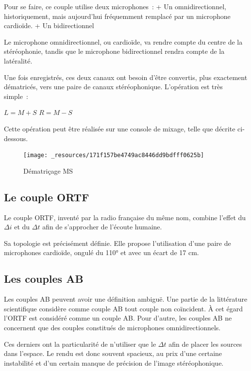\documentclass[
]{book}
\begin{document}
Pour se faire, ce couple utilise deux microphones~:
+ Un omnidirectionnel, historiquement, mais aujourd'hui fréquemment remplacé par un microphone cardioïde.
+ Un bidirectionnel

Le microphone omnidirectionnel, ou cardioïde, va rendre compte du centre de la stéréophonie, tandis que le microphone bidirectionnel rendra compte de la latéralité.

Une fois enregistrés, ces deux canaux ont besoin d'être convertis, plus exactement dématricés, vers une paire de canaux stéréophonique. L'opération est très simple~:

\(L = M+S\)
\(R = M-S\)

Cette opération peut être réalisée sur une console de mixage, telle que décrite ci-dessous.

\begin{figure}
\texttt{[image: \_resources/171f157be4749ac8446dd9bdfff0625b]} \caption{Dématriçage MS}\label{fig:chunk-label}
\end{figure}

\hypertarget{le-couple-ortf}{%
\subsection{Le couple ORTF}\label{le-couple-ortf}}

Le couple ORTF, inventé par la radio française du même nom, combine l'effet du \(\Delta i\) et du \(\Delta t\) afin de s'approcher de l'écoute humaine.

Sa topologie est précisément définie. Elle propose l'utilisation d'une paire de microphones cardioïde, ongulé du 110° et avec un écart de 17 cm.

\hypertarget{les-couples-ab}{%
\subsection{Les couples AB}\label{les-couples-ab}}

Les couples AB peuvent avoir une définition ambiguë. Une partie de la littérature scientifique considère comme couple AB tout couple non coïncident. À cet égard l'ORTF est considéré comme un couple AB. Pour d'autre, les couples AB ne concernent que des couples constitués de microphones omnidirectionnels.

Ces derniers ont la particularité de n'utiliser que le \(\Delta t\) afin de placer les sources dans l'espace. Le rendu est donc souvent spacieux, au prix d'une certaine instabilité et d'un certain manque de précision de l'image stéréophonique.
\end{document}
